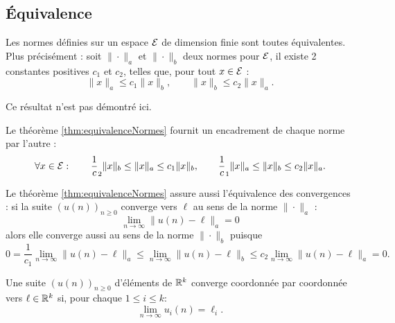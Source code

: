 \subsection{\'Equivalence} 

\begin{theorem} \label{thm:equivalenceNormes}
  Les normes définies sur un espace $\mathcal{E}$ de dimension finie sont toutes équivalentes. Plus précisément : soit $\|\cdot\|_a$ et $\|\cdot\|_b$ deux normes pour $\mathcal{E}$, il existe 2 constantes positives $c_1$ et $c_2$, telles que, pour tout $x \in \mathcal{E}$ :
  $$
  \|x\|_a \leq c_1 \|x\|_b, \qquad
  \|x\|_b \leq c_2 \|x\|_a.
  $$
\end{theorem}

Ce résultat n'est pas démontré ici. \eproof

\remark
Le théorème \ref{thm:equivalenceNormes} fournit un encadrement de chaque norme par l'autre : 
$$
\forall x \in \mathcal{E}: \qquad
\frac1c_2 \|x\|_b \leq \|x\|_a \leq c_1 \|x\|_b, \qquad
\frac1c_1 \|x\|_a \leq \|x\|_b \leq c_2 \|x\|_a.
$$


\remark
Le théorème \ref{thm:equivalenceNormes} assure aussi l'équivalence des convergences : si la suite $(u(n))_{n \geq 0}$ converge vers $\ell$ au sens de la norme $\|\cdot\|_a$ :
$$
\lim_{n \to \infty} \|u(n) - \ell\|_a = 0
$$
alors elle converge aussi au sens de la norme $\|\cdot\|_b$ puisque
$$
0 = \frac1{c_1} \lim_{n \to \infty} \|u(n) - \ell\|_a
\leq \lim_{n \to \infty} \|u(n) - \ell\|_b \leq
c_2 \lim_{n \to \infty} \|u(n) - \ell\|_a = 0.
$$

\begin{definition}
  Une suite $(u(n))_{n \geq 0}$ d'éléments de $\mathbb{R}^k$ converge coordonnée par coordonnée vers $\ell \in \mathbb{R}^k$ si, pour chaque $1 \leq i \leq k$:
  $$
  \lim_{n \to \infty} u_i(n) = \ell_i.
  $$
\end{definition}

